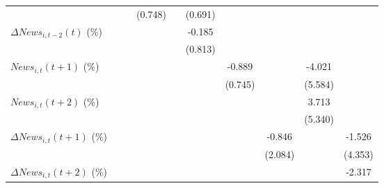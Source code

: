 {\begin{tabular}{l*{9}{c}}
                    &                     &                     &     (0.748)         &                     &     (0.691)         &                     &                     &                     &                     \\
\addlinespace
$ \Delta News_{i,t-2}(t)$ (\%)&                     &                     &                     &                     &      -0.185         &                     &                     &                     &                     \\
                    &                     &                     &                     &                     &     (0.813)         &                     &                     &                     &                     \\
\addlinespace
$ News_{i,t}(t+1)$ (\%)&                     &                     &                     &                     &                     &      -0.889         &                     &      -4.021         &                     \\
                    &                     &                     &                     &                     &                     &     (0.745)         &                     &     (5.584)         &                     \\
\addlinespace
$ News_{i,t}(t+2)$ (\%)&                     &                     &                     &                     &                     &                     &                     &       3.713         &                     \\
                    &                     &                     &                     &                     &                     &                     &                     &     (5.340)         &                     \\
\addlinespace
$ \Delta News_{i,t}(t+1)$ (\%)&                     &                     &                     &                     &                     &                     &      -0.846         &                     &      -1.526         \\
                    &                     &                     &                     &                     &                     &                     &     (2.084)         &                     &     (4.353)         \\
\addlinespace
$ \Delta News_{i,t}(t+2)$ (\%)&                     &                     &                     &                     &                     &                     &                     &                     &      -2.317\sym{***}\\

\end{tabular}}
